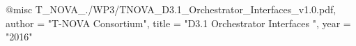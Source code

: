 @misc{ T_NOVA_./WP3/TNOVA_D3.1_Orchestrator_Interfaces_v1.0.pdf,
       author = "{T-NOVA Consortium}",
       title = "D3.1 Orchestrator Interfaces ",
       year = "2016" }
